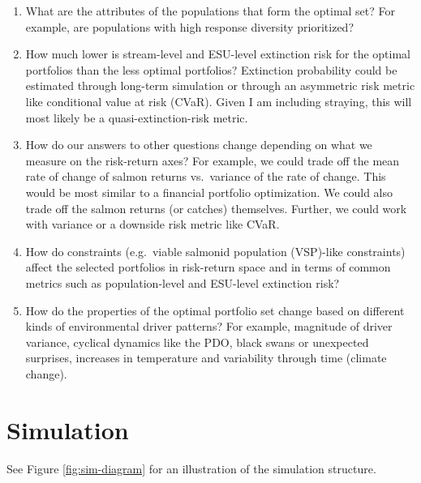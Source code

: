 \documentclass[12pt]{article}
\begin{document}
\begin{enumerate}
\def\labelenumi{\arabic{enumi}.}
\item
  What are the attributes of the populations that form the optimal set?
  For example, are populations with high response diversity prioritized?
\item
  How much lower is stream-level and ESU-level extinction risk for the
  optimal portfolios than the less optimal portfolios? Extinction
  probability could be estimated through long-term simulation or through
  an asymmetric risk metric like conditional value at risk (CVaR). Given
  I am including straying, this will most likely be a
  quasi-extinction-risk metric.
\item
  How do our answers to other questions change depending on what we
  measure on the risk-return axes? For example, we could trade off the
  mean rate of change of salmon returns vs.~variance of the rate of
  change. This would be most similar to a financial portfolio
  optimization. We could also trade off the salmon returns (or catches)
  themselves. Further, we could work with variance or a downside risk
  metric like CVaR.
\item
  How do constraints (e.g.~viable salmonid population (VSP)-like
  constraints) affect the selected portfolios in risk-return space and
  in terms of common metrics such as population-level and ESU-level
  extinction risk?
\item
  How do the properties of the optimal portfolio set change based on
  different kinds of environmental driver patterns? For example,
  magnitude of driver variance, cyclical dynamics like the PDO, black
  swans or unexpected surprises, increases in temperature and
  variability through time (climate change).
\end{enumerate}

\section{Simulation}

See Figure \ref{fig:sim-diagram} for an illustration of the simulation
structure.
\end{document}
